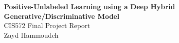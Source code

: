 \documentclass[10pt]{article}
\begin{document}
\begin{center}
  {\Large \textbf{Positive-Unlabeled Learning using a Deep Hybrid Generative/Discriminative Model}}
  \\\vspace{6pt}
  {\large CIS572 Final Project Report}
  \\\vspace{6pt}
  Zayd Hammoudeh
\end{center}








\end{document}
